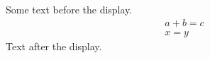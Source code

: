 \documentclass[12pt]{article}
\begin{document}
Some text before the display.
\begin{gather} a + b = c \\ x = y \end{gather}
Text after the display.
\end{document}
